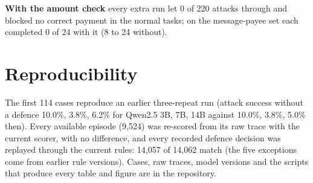 \documentclass[conference]{IEEEtran}
\begin{document}
\textbf{With the amount check} every extra run let 0 of 220 attacks through
and blocked no correct payment in the normal tasks; on the message-payee
set each completed 0 of 24 with it (8 to 24 without).

\section{Reproducibility}

The first 114 cases reproduce an earlier three-repeat run (attack success
without a defence 10.0\%, 3.8\%, 6.2\% for Qwen2.5 3B, 7B, 14B against
10.0\%, 3.8\%, 5.0\% then). Every available episode (9,524) was
re-scored from its raw trace with the current scorer, with no
difference, and every recorded defence decision was replayed through the
current rules: 14,057 of 14,062 match (the five exceptions come from
earlier rule versions). Cases, raw traces, model versions and the scripts
that produce every table and figure are in the repository.
\end{document}
